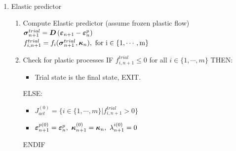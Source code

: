 \documentclass[epsf,a4paper]{article}
\newcommand{\mbf}[1]{\mbox{\boldmath$#1$}}
\newcommand{\ep}[0]{\mbf{\varepsilon}^p}
\newcommand{\e}{\mbf{\varepsilon}}
\newcommand{\sig}{\mbf{\sigma}}
\newcommand{\kap}{\mbf{\kappa}}
\begin{document}
\begin{table}
\label{closespointalgo}
{\small
\begin{enumerate}
\item
  Elastic predictor
 
  \begin{enumerate}
  \item 
    Compute Elastic predictor (assume frozen plastic flow)\\
    $\sig^{trial}_{n+1} = \mbf{D}\left(\e_{n+1}-\ep_{n}\right)$\\
    $f^{trial}_{i,n+1}=f_i(\sig^{trial}_{n+1},\kap_{n}),\ \rm{for}\ i\in\{1,\cdots,m\}$
  \item 
    Check for plastic processes
    IF $f^{trial}_{i,n+1}\le 0$ for all $i\in\{1,\cdots,m\}$ THEN:
    \begin{itemize}
      \item[]
        Trial state is the final state, EXIT.
    \end{itemize}
    ELSE:
    \begin{itemize}
    \item[]
      $J^{(0)}_{act}=\{i\in\{1,\cdots,m\}|f^{trial}_{i,n+1} > 0\}$
    \item[]
      $\e^{p(0)}_{n+1}=\ep_n,\ \kap^{(0)}_{n+1}=\kap_n,\ \lambda^{i(0)}_{n+1}=0$
    \end{itemize}
    ENDIF
   \end{enumerate}


\end{enumerate}}
\end{table}
\end{document}
